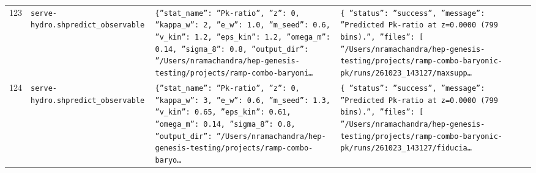 \documentclass[11pt,a4paper]{article}
\begin{document}
\begin{longtable}{@{}p{}p{}p{}p{}@{}}
123 & \texttt{serve-hydro.sh}\newline\texttt{predict\_\allowbreak{}observable} & \texttt{\{''stat\_\allowbreak{}name'':\allowbreak{} ''Pk-ratio'',\allowbreak{} ''z'':\allowbreak{} 0,\allowbreak{} ''kappa\_\allowbreak{}w'':\allowbreak{} 2,\allowbreak{} ''e\_\allowbreak{}w'':\allowbreak{} 1.0,\allowbreak{} ''m\_\allowbreak{}seed'':\allowbreak{} 0.6,\allowbreak{} ''v\_\allowbreak{}kin'':\allowbreak{} 1.2,\allowbreak{} ''eps\_\allowbreak{}kin'':\allowbreak{} 1.2,\allowbreak{} ''omega\_\allowbreak{}m'':\allowbreak{} 0.14,\allowbreak{} ''sigma\_\allowbreak{}8'':\allowbreak{} 0.8,\allowbreak{} ''output\_\allowbreak{}dir'':\allowbreak{} ''/\allowbreak{}Users/\allowbreak{}nramachandra/\allowbreak{}hep-genesis-testing/\allowbreak{}projects/\allowbreak{}ramp-combo-baryoni\ldots{}\allowbreak{}} & \texttt{\{   ''status'':\allowbreak{} ''success'',\allowbreak{}   ''message'':\allowbreak{} ''Predicted Pk-ratio at z=\allowbreak{}0.0000 (799 bins)\allowbreak{}.'',\allowbreak{}   ''files'':\allowbreak{} [     ''/\allowbreak{}Users/\allowbreak{}nramachandra/\allowbreak{}hep-genesis-testing/\allowbreak{}projects/\allowbreak{}ramp-combo-baryonic-pk/\allowbreak{}runs/\allowbreak{}261023\_\allowbreak{}143127/\allowbreak{}maxsupp\ldots{}\allowbreak{}} \\
124 & \texttt{serve-hydro.sh}\newline\texttt{predict\_\allowbreak{}observable} & \texttt{\{''stat\_\allowbreak{}name'':\allowbreak{} ''Pk-ratio'',\allowbreak{} ''z'':\allowbreak{} 0,\allowbreak{} ''kappa\_\allowbreak{}w'':\allowbreak{} 3,\allowbreak{} ''e\_\allowbreak{}w'':\allowbreak{} 0.6,\allowbreak{} ''m\_\allowbreak{}seed'':\allowbreak{} 1.3,\allowbreak{} ''v\_\allowbreak{}kin'':\allowbreak{} 0.65,\allowbreak{} ''eps\_\allowbreak{}kin'':\allowbreak{} 0.61,\allowbreak{} ''omega\_\allowbreak{}m'':\allowbreak{} 0.14,\allowbreak{} ''sigma\_\allowbreak{}8'':\allowbreak{} 0.8,\allowbreak{} ''output\_\allowbreak{}dir'':\allowbreak{} ''/\allowbreak{}Users/\allowbreak{}nramachandra/\allowbreak{}hep-genesis-testing/\allowbreak{}projects/\allowbreak{}ramp-combo-baryo\ldots{}\allowbreak{}} & \texttt{\{   ''status'':\allowbreak{} ''success'',\allowbreak{}   ''message'':\allowbreak{} ''Predicted Pk-ratio at z=\allowbreak{}0.0000 (799 bins)\allowbreak{}.'',\allowbreak{}   ''files'':\allowbreak{} [     ''/\allowbreak{}Users/\allowbreak{}nramachandra/\allowbreak{}hep-genesis-testing/\allowbreak{}projects/\allowbreak{}ramp-combo-baryonic-pk/\allowbreak{}runs/\allowbreak{}261023\_\allowbreak{}143127/\allowbreak{}fiducia\ldots{}\allowbreak{}} \\

\end{longtable}
\end{document}
